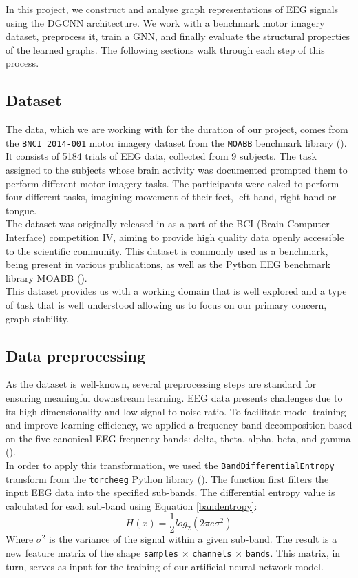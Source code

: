 In this project, we construct and analyse graph representations of EEG signals using the DGCNN architecture. We work with a benchmark motor imagery dataset, preprocess it, train a GNN, and finally evaluate the structural properties of the learned graphs. The following sections walk through each step of this process.
\subsection{Dataset}
The data, which we are working with for the duration of our project, comes from the \texttt{BNCI 2014-001} motor imagery dataset from the \texttt{MOABB} benchmark library (\cite{moabb}). It consists of 5184 trials of EEG data, collected from 9 subjects. The task assigned to the subjects whose brain activity was documented prompted them to perform different motor imagery tasks. The participants were asked to perform four different tasks, imagining movement of their feet, left hand, right hand or tongue.
\vspace{0.5em}\\
The dataset was originally released in \cite{dataset} as a part of the BCI (Brain Computer Interface) competition IV, aiming to provide high quality data openly accessible to the scientific community. This dataset is commonly used as a benchmark, being present in various publications, as well as the Python EEG benchmark library MOABB (\cite{moabb}).
\\
This dataset provides us with a working domain that is well explored and a type of task that is well understood allowing us to focus on our primary concern, graph stability. 
\subsection{Data preprocessing}
As the dataset is well-known, several preprocessing steps are standard for ensuring meaningful downstream learning. EEG data presents challenges due to its high dimensionality and low signal-to-noise ratio. To facilitate model training and improve learning efficiency, we applied a frequency-band decomposition based on the five canonical EEG frequency bands: delta, theta, alpha, beta, and gamma (\cite{EEGWaves}).
\vspace{0.5em}\\
In order to apply this transformation, we used the \texttt{BandDifferentialEntropy} transform from the \texttt{torcheeg} Python library (\cite{torcheeg}). The function first filters the input EEG data into the specified sub-bands. The differential entropy value is calculated for each sub-band using Equation \ref{bandentropy}:
\begin{equation}\label{bandentropy}
    H(x) = \frac{1}{2}log_2(2\pi e \sigma^2)
\end{equation}
Where $\sigma^2$ is the variance of the signal within a given sub-band. The result is a new feature matrix of the shape \texttt{samples} $\times$ \texttt{channels} $\times$ \texttt{bands}. This matrix, in turn, serves as input for the training of our artificial neural network model.
